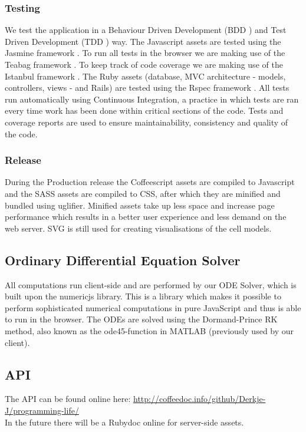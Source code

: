 \documentclass{report}
\begin{document}
			\subsubsection{Testing}
				We test the application in a Behaviour Driven Development (BDD \cite{bdd}) and Test Driven Development (TDD \cite{tdd} ) way. 
				The Javascript assets are tested using the Jasmine framework \cite{jasmine}. 
				To run all tests in the browser we are making use of the Teabag framework \cite{teabag}. 
				To keep track of code coverage we are making use of the Istanbul framework \cite{istanbul}.
				The Ruby assets (database, MVC architecture - models, controllers, views - and Rails) are tested using the Rspec framework \cite{rspec}.  
				All tests run automatically using Continuous Integration, a practice in which tests are ran every time work has been done within critical sections of the code. 
				Tests and coverage reports are used to ensure maintainability, consistency and quality of the code.
				
			\subsubsection{Release}
				During the Production release the Coffeescript assets are compiled to Javascript\cite{javascript} and the SASS assets are compiled to CSS, after which they are minified and bundled using uglifier\cite{uglifier}. Minified assets take up less space and increase page performance which results in a better user experience and less demand on the web server. 
				SVG is still used for creating visualisations of the cell models.
		\newpage		
		
		\subsection{Ordinary Differential Equation Solver}
			All computations run client-side and are performed by our ODE Solver, which is built upon the numericjs\cite{numericjs} library. This is a library which makes it possible to perform sophisticated numerical computations in pure JavaScript and thus is able to run in the browser. The ODEs are solved using the Dormand-Prince RK method\cite{dormandprince}, also known as the ode45-function in MATLAB (previously used by our client).
			
		\subsection{API}
			The API can be found online here: \url{http://coffeedoc.info/github/Derkje-J/programming-life/} \\
			In the future there will be a Rubydoc online for server-side assets.
		\newpage
			
\end{document}
